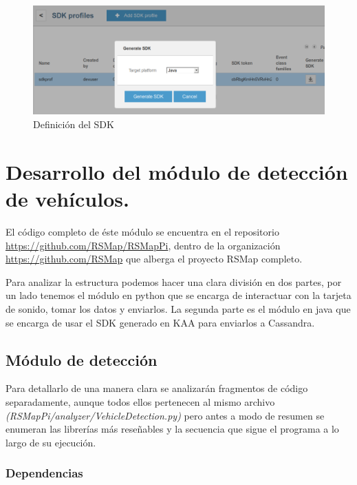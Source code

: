 \begin{figure}[!ht]
  \begin{center}
    \includegraphics[scale=0.30]{../images/sdk/2.png}
		\caption{Definición del SDK}
    \label{fig:kaa}
	\end{center}
\end{figure}

\newpage

\section{Desarrollo del módulo de detección de vehículos.}

El código completo de éste módulo se encuentra en el repositorio \url{https://github.com/RSMap/RSMapPi}, dentro de la organización \url{https://github.com/RSMap} que alberga el proyecto RSMap completo.

\bigskip

Para analizar la estructura podemos hacer una clara división en dos partes, por un lado tenemos el módulo en python que se encarga de interactuar con la tarjeta de sonido, tomar los datos y enviarlos. La segunda parte es el módulo en java que se encarga de usar el SDK generado en KAA para enviarlos a Cassandra.

\subsection{Módulo de detección}

Para detallarlo de una manera clara se analizarán fragmentos de código separadamente, aunque todos ellos pertenecen al mismo archivo \textit{(RSMapPi/\/analyzer/\/VehicleDetection.py)} pero antes a modo de resumen se enumeran las librerías más reseñables y la secuencia que sigue el programa a lo largo de su ejecución.

\subsubsection{Dependencias}


